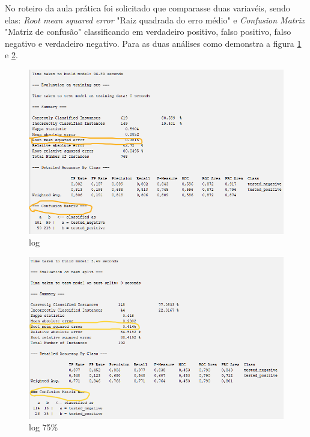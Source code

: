 \par No roteiro da aula prática foi solicitado que comparasse duas variavéis, sendo elas: \textit{Root mean squared error} "Raiz quadrada do erro médio" e \textit{Confusion Matrix} "Matriz de confusão" classificando em verdadeiro positivo, falso positivo, falso negativo e verdadeiro negativo. Para as duas análises como demonstra a figura \ref{fig:normal} e \ref{fig:75erro}.
\begin{figure}[H]
  \center
  \includegraphics[scale=0.6]{figure/result_true3.png}
  \caption{log}\label{fig:normal}
\end{figure}

\begin{figure}[H]
  \center
  \includegraphics[scale=0.6]{figure/result_true_75p.png}
  \caption{log 75\%}\label{fig:75erro}
\end{figure}

